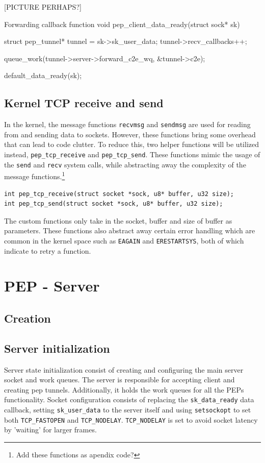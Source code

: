 \documentclass[a4paper,english, 11pt]{report}
\begin{document}
[PICTURE PERHAPS?]

\begin{autonumlstlisting}[label=lst:pep_forward_callback]{Forwarding callback function}
void pep_client_data_ready(struct sock* sk)
{
	struct pep_tunnel* tunnel = sk->sk_user_data;
	tunnel->recv_callbacks++;
        
	queue_work(tunnel->server->forward_c2e_wq, &tunnel->c2e);
        
	default_data_ready(sk);
}
\end{autonumlstlisting}

\subsection{Kernel TCP receive and send}
In the kernel, the message functions \verb|recvmsg| and \verb|sendmsg| are used for reading from and sending data to sockets. However, these functions bring some overhead that can lead to code clutter. To reduce this, two helper functions will be utilized instead, \verb|pep_tcp_receive| and \verb|pep_tcp_send|. These functions mimic the usage of the \verb|send| and \verb|recv| system calls, while abstracting away the complexity of the message functions.\footnote{Add these functions as apendix code?}

\begin{verbatim}
int pep_tcp_receive(struct socket *sock, u8* buffer, u32 size);
int pep_tcp_send(struct socket *sock, u8* buffer, u32 size);
\end{verbatim}

The custom functions only take in the socket, buffer and size of buffer as parameters. These functions also abstract away certain error handling which are common in the kernel space such as \verb|EAGAIN| and \verb|ERESTARTSYS|, both of which indicate to retry a function.

\section{PEP - Server}

\subsection{Creation}

\subsection{Server initialization}
Server state initialization consist of creating and configuring the main server socket and work queues. The server is responsible for accepting client and creating pep tunnels. Additionally, it holds the work queues for all the PEPs functionality. Socket configuration consists of replacing the \verb|sk_data_ready| data callback, setting \verb|sk_user_data| to the server itself and using \verb|setsockopt| to set both \verb|TCP_FASTOPEN| and \verb|TCP_NODELAY|. \verb|TCP_NODELAY| is set to avoid socket latency by 'waiting' for larger frames.
\end{document}
